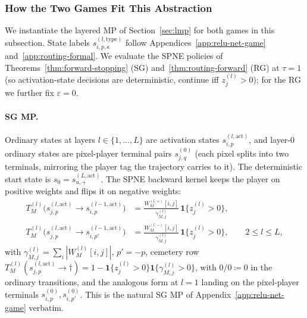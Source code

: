 \documentclass[twoside]{article}
\newcommand{\1}{\mathbf{1}}
\begin{document}
\subsubsection{How the Two Games Fit This Abstraction}\label{sec:games-fit}

We instantiate the layered MP of Section~\ref{sec:lmp} for both games in this subsection. State
labels $s^{(l,\mathrm{type})}_{i,p,\kappa}$ follow Appendices~\ref{app:relu-net-game}
and~\ref{app:routing-formal}. We evaluate the SPNE policies of Theorems~\ref{thm:forward-stopping}
(\ac{SG}) and~\ref{thm:routing-forward} (\ac{RG}) at $\tau = 1$ (so activation-state decisions are
deterministic, continue iff $z_j^{(l)} > 0$); for the \ac{RG} we further fix $\varepsilon = 0$.

\paragraph{\ac{SG} MP.}
Ordinary states at layers $l \in \{1,\ldots,L\}$ are activation states
$s^{(l,\mathrm{act})}_{i,p}$, and layer-$0$ ordinary states are pixel-player terminal pairs
$s^{(0)}_{j,q}$ (each pixel splits into two terminals, mirroring the player tag the trajectory
carries to it). The deterministic start state is $s_0 = s^{(L,\mathrm{act})}_{u,+}$. The SPNE
backward kernel keeps the player on positive weights and flips it on negative weights:
\begin{align}
    T^{(l)}_M\bigl(s^{(l,\mathrm{act})}_{j,p} \to s^{(l-1,\mathrm{act})}_{i,p}\bigr)
    &= \frac{W^{(l,+)}_M[i,j]}{\gamma^{(l)}_{M,j}}\,\1\{z_j^{(l)} > 0\},
    \nonumber \\
    T^{(l)}_M\bigl(s^{(l,\mathrm{act})}_{j,p} \to s^{(l-1,\mathrm{act})}_{i,p'}\bigr)
    &= \frac{W^{(l,-)}_M[i,j]}{\gamma^{(l)}_{M,j}}\,\1\{z_j^{(l)} > 0\},
    \qquad 2 \le l \le L,
    \label{eq:adf-T}
\end{align}
with $\gamma^{(l)}_{M,j} = \sum_i |W^{(l)}_M[i,j]|$, $p' = -p$, cemetery row
$T^{(l)}_M(s^{(l,\mathrm{act})}_{j,p}\to\dagger)=1-\1\{z_j^{(l)}>0\}\1\{\gamma^{(l)}_{M,j}>0\}$, with $0/0\coloneqq0$ in the ordinary transitions, and the analogous form
at $l = 1$ landing on the pixel-player terminals $s^{(0)}_{i,p}, s^{(0)}_{i,p'}$. This is the
natural \ac{SG} MP of Appendix~\ref{app:relu-net-game} verbatim.
\end{document}
